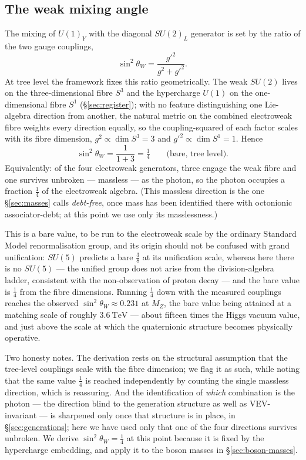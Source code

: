 \subsection{The weak mixing angle}

The mixing of $U(1)_Y$ with the diagonal $SU(2)_L$ generator is set by the ratio of the two gauge
couplings,
\begin{equation}
  \sin^2\theta_W = \frac{g'^2}{g^2 + g'^2}.
\end{equation}
At tree level the framework fixes this ratio geometrically. The weak $SU(2)$ lives on the
three-dimensional fibre $S^3$ and the hypercharge $U(1)$ on the one-dimensional fibre $S^1$
(\S\ref{sec:register}); with no feature distinguishing one Lie-algebra direction from another, the
natural metric on the combined electroweak fibre weights every direction equally, so the
coupling-squared of each factor scales with its fibre dimension, $g^2 \propto \dim S^3 = 3$ and
$g'^2 \propto \dim S^1 = 1$. Hence
\begin{equation}
  \sin^2\theta_W = \frac{1}{1+3} = \tfrac14
  \qquad\text{(bare, tree level).}
\end{equation}
Equivalently: of the four electroweak generators, three engage the weak fibre and one survives
unbroken --- massless --- as the photon, so the photon occupies a fraction $\tfrac14$ of the
electroweak algebra. (This massless direction is the one \S\ref{sec:masses} calls \emph{debt-free},
once mass has been identified there with octonionic associator-debt; at this point we use only its
masslessness.)

This is a bare value, to be run to the electroweak scale by the ordinary Standard Model
renormalisation group, and its origin should not be confused with grand unification: $SU(5)$
predicts a bare $\tfrac38$ at its unification scale, whereas here there is no $SU(5)$ --- the
unified group does not arise from the division-algebra ladder, consistent with the non-observation
of proton decay --- and the bare value is $\tfrac14$ from the fibre dimensions. Running $\tfrac14$
down with the measured couplings reaches the observed $\sin^2\theta_W \approx 0.231$ at $M_Z$, the
bare value being attained at a matching scale of roughly $3.6\ \mathrm{TeV}$ --- about fifteen
times the Higgs vacuum value, and just above the scale at which the quaternionic structure becomes
physically operative.

Two honesty notes. The derivation rests on the structural assumption that the tree-level couplings
scale with the fibre dimension; we flag it as such, while noting that the same value $\tfrac14$ is
reached independently by counting the single massless direction, which is reassuring. And the
identification of \emph{which} combination is the photon --- the direction blind to the generation
structure as well as VEV-invariant --- is sharpened only once that structure is in place, in
\S\ref{sec:generations}; here we have used only that one of the four directions survives unbroken.
We derive $\sin^2\theta_W = \tfrac14$ at this point because it is fixed by the hypercharge embedding,
and apply it to the boson masses in \S\ref{sec:boson-masses}.

